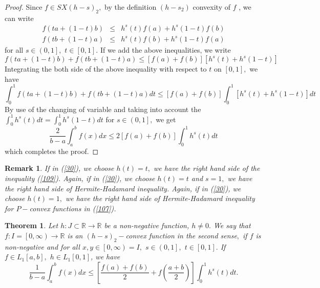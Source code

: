 \documentclass{amsart}
\newtheorem{theorem}{Theorem}
\theoremstyle{plain}
\newtheorem{remark}{Remark}
\numberwithin{equation}{section}
\begin{document}
\begin{proof}
\bigskip Since $f\in SX(h-s)_{2},$ by the definition $(h-s_{2})$ convexity
of $f$ , we can write\begin{eqnarray*}
f\left( ta+\left( 1-t\right) b\right) &\leq &h^{s}\left( t\right) f\left(
a\right) +h^{s}\left( 1-t\right) f\left( b\right) \\
f\left( tb+\left( 1-t\right) a\right) &\leq &h^{s}\left( t\right) f\left(
b\right) +h^{s}\left( 1-t\right) f\left( a\right)
\end{eqnarray*}for all $s\in \left( 0,1\right] ,$ $t\in \left[ 0,1\right] .$ If we add the
above inequalities, we write\begin{equation*}
f\left( ta+\left( 1-t\right) b\right) +f\left( tb+\left( 1-t\right) a\right)
\leq \left[ f\left( a\right) +f\left( b\right) \right] \left[ h^{s}\left(
t\right) +h^{s}\left( 1-t\right) \right]
\end{equation*}Integrating the both side of the above inequality with respect to $t$ on $\left[ 0,1\right] ,$ we have\begin{equation*}
\int_{0}^{1}f\left( ta+\left( 1-t\right) b\right) +f\left( tb+\left(
1-t\right) a\right) dt\leq \left[ f\left( a\right) +f\left( b\right) \right]
\int_{0}^{1}\left[ h^{s}\left( t\right) +h^{s}\left( 1-t\right) \right] dt
\end{equation*}By use of the changing of variable and taking into account the $\int_{0}^{1}h^{s}\left( t\right) dt=\int_{0}^{1}h^{s}\left( 1-t\right) dt$
for $s\in \left( 0,1\right] ,$ we get\begin{equation*}
\frac{2}{b-a}\int_{a}^{b}f(x)dx\leq 2\left[ f\left( a\right) +f\left(
b\right) \right] \int_{0}^{1}h^{s}\left( t\right) dt
\end{equation*}which completes the proof.
\end{proof}

\begin{remark}
If in (\ref{30}), we choose $h(t)=t,$ we have the right hand side of the
inequality (\ref{109}). Again, if in (\ref{30}), we choose $h(t)=t$ and $s=1, $ we have the right hand side of Hermite-Hadamard inequality. Again, if
in (\ref{30}), we choose $h(t)=1,$ we have the right hand side of
Hermite-Hadamard inequality for $P-$convex functions in (\ref{107}).
\end{remark}

\begin{theorem}
\label{th5} Let $h:J\subset 
\mathbb{R}
\rightarrow 
\mathbb{R}
$ be a non-negative function, $h\neq 0.$ We say that $f:I=\left[ 0,\infty
\right) \rightarrow 
\mathbb{R}
$ is an $(h-s)_{2}-$convex function in the second sense$,$ if $f$ is
non-negative and for all $x,y\in \left[ 0,\infty \right) =I,$ $s\in \left(
0,1\right] ,$ $t\in \left[ 0,1\right] .$ If $f\in L_{1}\left[ a,b\right] ,$ $h\in L_{1}\left[ 0,1\right] $, we have 
\begin{equation}
\frac{1}{b-a}\int_{a}^{b}f(x)dx\leq \left[ \frac{f\left( a\right) +f\left(
b\right) }{2}+f\left( \frac{a+b}{2}\right) \right] \int_{0}^{1}h^{s}\left(
t\right) dt.  \label{31}
\end{equation}
\end{theorem}
\end{document}
